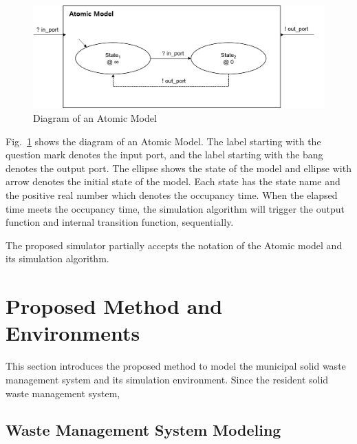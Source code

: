 \documentclass{scsSimAUDPaperFormat}
\begin{document}
\begin{figure}[!h]
    \centering
    \includegraphics[width=1.0\columnwidth]{fig/Atomic_model}
    \caption{Diagram of an Atomic Model}
    \label{Fig:AtomicModel}
\end{figure}

Fig.~\ref{Fig:AtomicModel} shows the diagram of an Atomic Model. The label starting with the question mark denotes the input port, and the label starting with the bang denotes the output port. The ellipse shows the state of the model and ellipse with arrow denotes the initial state of the model. Each state has the state name and the positive real number which denotes the occupancy time. When the elapsed time meets the occupancy time, the simulation algorithm will trigger the output function and internal transition function, sequentially. 

The proposed simulator partially accepts the notation of the Atomic model and its simulation algorithm. 

\section{Proposed Method and Environments}

This section introduces the proposed method to model the municipal solid waste management system and its simulation environment. Since the resident solid waste management system, 

\subsection{Waste Management System Modeling}





\end{document}
